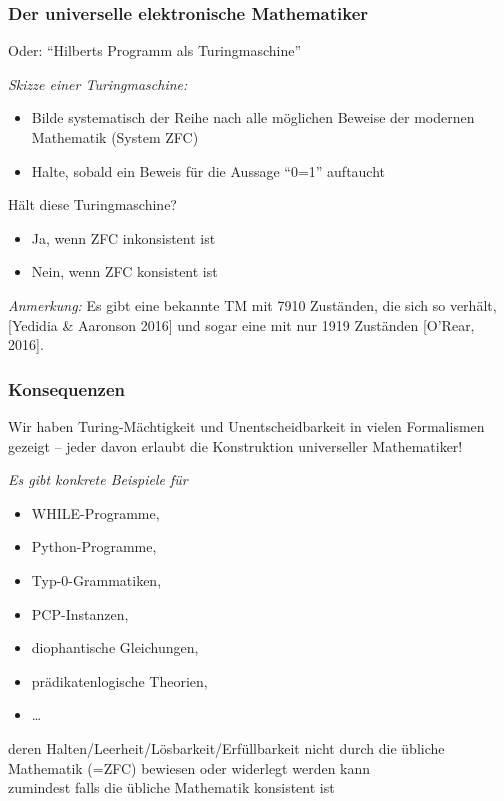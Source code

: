 \documentclass[aspectratio=1610,onlymath]{beamer}
\begin{document}
\begin{frame}\frametitle{Der universelle elektronische Mathematiker}

Oder: "`Hilberts Programm als Turingmaschine"'
\bigskip

\emph{Skizze einer Turingmaschine:}
\begin{itemize}
\item Bilde systematisch der Reihe nach alle möglichen Beweise der modernen Mathematik (System ZFC)
\item Halte, sobald ein Beweis für die Aussage "`0=1"' auftaucht
\end{itemize}
\alert{Hält diese Turingmaschine?}\pause
\begin{itemize}
\item Ja, wenn ZFC inkonsistent ist
\item Nein, wenn ZFC konsistent ist
\end{itemize}\pause
\bigskip

\pause\medskip

\emph{Anmerkung:} Es gibt eine bekannte TM mit 7910 Zuständen, die sich so verhält, [Yedidia \& Aaronson 2016] und sogar eine mit nur 1919 Zuständen [O’Rear, 2016].

\end{frame}

\begin{frame}\frametitle{Konsequenzen}

Wir haben Turing-Mächtigkeit und Unentscheidbarkeit in vielen Formalismen gezeigt -- jeder davon erlaubt die Konstruktion universeller Mathematiker!
\bigskip

\emph{Es gibt konkrete Beispiele für}
\begin{itemize}
\item WHILE-Programme,
\item Python-Programme,
\item Typ-0-Grammatiken,
\item PCP-Instanzen,
\item diophantische Gleichungen,
\item prädikatenlogische Theorien,
\item \ldots
\end{itemize}
deren Halten/Leerheit/Lösbarkeit/Erfüllbarkeit nicht durch die übliche Mathematik (=ZFC) bewiesen oder widerlegt werden kann\\[-0.5ex]
{\tiny zumindest falls die übliche Mathematik konsistent ist}

\end{frame}
\end{document}
